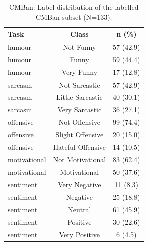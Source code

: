 \begin{table}[t]
\centering
\small
\caption{CMBan: Label distribution of the labelled CMBan subset (N=133).}
\label{tab:data_cmban}
\begin{tabular}{lcc}
\toprule
Task & Class & n (\%) \\
\midrule
humour & Not Funny & 57 (42.9) \\
humour & Funny & 59 (44.4) \\
humour & Very Funny & 17 (12.8) \\
sarcasm & Not Sarcastic & 57 (42.9) \\
sarcasm & Little Sarcastic & 40 (30.1) \\
sarcasm & Very Sarcastic & 36 (27.1) \\
offensive & Not Offensive & 99 (74.4) \\
offensive & Slight Offensive & 20 (15.0) \\
offensive & Hateful Offensive & 14 (10.5) \\
motivational & Not Motivational & 83 (62.4) \\
motivational & Motivational & 50 (37.6) \\
sentiment & Very Negative & 11 (8.3) \\
sentiment & Negative & 25 (18.8) \\
sentiment & Neutral & 61 (45.9) \\
sentiment & Positive & 30 (22.6) \\
sentiment & Very Positive & 6 (4.5) \\
\bottomrule
\end{tabular}
\end{table}

